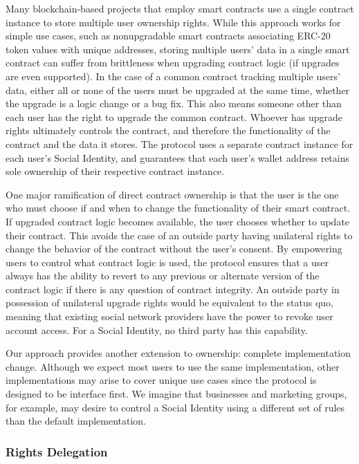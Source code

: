 \documentclass[12pt,letterpaper]{article}
\begin{document}
Many blockchain-based projects that employ smart contracts use a single contract instance
to store multiple user ownership rights. While this approach works for simple use cases,
such as nonupgradable smart contracts associating ERC-20\cite{erc20} token values with
unique addresses, storing multiple users' data in a single smart contract can suffer from
brittleness when upgrading contract logic (if upgrades are even supported). In the case of
a common contract tracking multiple users' data, either all or none of the users must be
upgraded at the same time, whether the upgrade is a logic change or a bug fix. This also
means someone other than each user has the right to upgrade the common contract. Whoever
has upgrade rights ultimately controls the contract, and therefore the functionality of
the contract and the data it stores. The protocol uses a separate contract instance for
each user's Social Identity, and guarantees that each user's wallet address retains sole
ownership of their respective contract instance.

One major ramification of direct contract ownership is that the user is the one who must
choose if and when to change the functionality of their smart contract. If upgraded
contract logic becomes available, the user chooses whether to update their contract. This
avoids the case of an outside party having unilateral rights to change the behavior of the
contract without the user's consent. By empowering users to control what contract logic is
used, the protocol ensures that a user always has the ability to revert to any previous or
alternate version of the contract logic if there is any question of contract integrity. An
outside party in possession of unilateral upgrade rights would be equivalent to the status
quo, meaning that existing social network providers have the power to revoke user account
access. For a Social Identity, no third party has this capability.

Our  approach provides another extension to ownership: complete
implementation change. Although we expect most users to use the same implementation, other
implementations may arise to cover unique use cases since the protocol is designed to be
interface first. We imagine that businesses and marketing groups, for example, may desire
to control a Social Identity using a different set of rules than the default
implementation.

\subsubsection{Rights Delegation}
\end{document}
